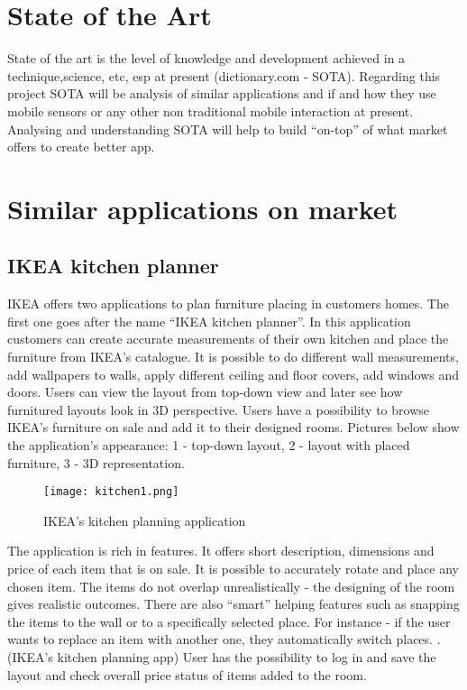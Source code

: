 \section{State of the Art}

State of the art is the level of knowledge and development achieved in a technique,science, etc, esp at present (dictionary.com - SOTA). Regarding this project SOTA will be analysis of similar applications and if and how they use mobile sensors or any other non traditional mobile interaction at present.  Analysing and understanding SOTA will help to build “on-top” of what market offers to create better app. 

\section{Similar applications on market} 
\subsection{IKEA kitchen planner}
IKEA offers two applications to plan furniture placing in customers homes. The first one goes after the name “IKEA kitchen planner”. In this application customers can create accurate measurements of their own kitchen and place the furniture from IKEA’s catalogue. It is possible to do different wall measurements, add wallpapers to walls, apply different ceiling and floor covers, add windows and doors. Users can view the layout from top-down view and later see how furnitured layouts look in 3D perspective.
Users have a possibility to browse IKEA’s furniture on sale and add it to their designed rooms.
Pictures below show the application’s appearance: 1 - top-down layout, 2 - layout with placed furniture, 3 - 3D representation.

\begin{figure}[H]
\centering
\texttt{[image: kitchen1.png]}
\caption{IKEA’s kitchen planning application}
\end{figure}


The application is rich in features. It offers short description, dimensions and price of each item that is on sale. It is possible to accurately rotate and place any chosen item. The items do not overlap unrealistically - the designing of the room gives realistic outcomes. There are also “smart” helping features such as snapping the items to the wall or to a specifically selected place. For instance - if the user wants to replace an item with another one, they automatically switch places.
.
(IKEA’s kitchen planning app)
User has the possibility to log in and save the layout and check overall price status of items added to the room.

